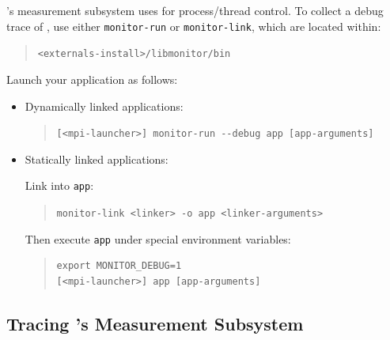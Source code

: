 \documentclass[11pt,twoside,letterpaper]{report}
\begin{document}
\HPCToolkit{}'s measurement subsystem
uses \libmonitor{} for process/thread control.
To collect a debug trace of \libmonitor{}, use either \texttt{monitor-run} or \texttt{monitor-link}, which are located within:
%
\begin{quote}
  \verb|<externals-install>/libmonitor/bin|
\end{quote}
Launch your application as follows:
%
\begin{itemize}

\item Dynamically linked applications:\hfill
\begin{quote}
  \verb|[<mpi-launcher>] monitor-run --debug app [app-arguments]|
\end{quote}

\item Statically linked applications:\hfill

Link \libmonitor{} into \texttt{app}:
\begin{quote}
  \verb|monitor-link <linker> -o app <linker-arguments>|
\end{quote}
%
Then execute \texttt{app} under special environment variables:
\begin{quote}
\begin{verbatim}
export MONITOR_DEBUG=1
[<mpi-launcher>] app [app-arguments]
\end{verbatim}
\end{quote}
\end{itemize}



\subsection{Tracing \HPCToolkit{}'s Measurement Subsystem}
\end{document}
